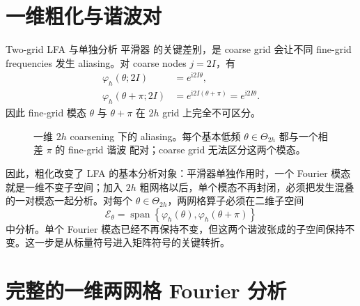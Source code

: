 \section{一维粗化与谐波对}
\label{sec:lfa-1d-aliasing}

Two-grid LFA 与单独分析 平滑器 的关键差别，是 coarse grid 会让不同 fine-grid frequencies 发生 aliasing。对 coarse nodes $j=2I$，有
\begin{align}
\varphi_h(\theta;2I)
&=e^{\mathrm i2I\theta},\\
\varphi_h(\theta+\pi;2I)
&=e^{\mathrm i2I(\theta+\pi)}
=e^{\mathrm i2I\theta}.
\end{align}
因此 fine-grid 模态 $\theta$ 与 $\theta+\pi$ 在 $2h$ grid 上完全不可区分。

\begin{figure}[htbp]
\centering
{}
\caption{一维 $2h$ coarsening 下的 aliasing。每个基本低频 $\theta\in\Theta_{2h}$ 都与一个相差 $\pi$ 的 fine-grid 谐波 配对；coarse grid 无法区分这两个模态。}
\label{fig:lfa-1d-aliasing-pair}
\end{figure}

因此，粗化改变了 LFA 的基本分析对象：平滑器单独作用时，一个 Fourier 模态就是一维不变子空间；加入 $2h$ 粗网格以后，单个模态不再封闭，必须把发生混叠的一对模态一起分析。对每个 $\theta\in\Theta_{2h}$，两网格算子必须在二维子空间
\begin{equation}
\mathcal E_\theta
=\operatorname{span}\left\{
\varphi_h(\theta),
\varphi_h(\theta+\pi)
\right\}
\label{eq:lfa-1d-harmonic-space}
\end{equation}
中分析。单个 Fourier 模态已经不再保持不变，但这两个谐波张成的子空间保持不变。这一步是从标量符号进入矩阵符号的关键转折。

\section{完整的一维两网格 Fourier 分析}
\label{sec:lfa-complete-1d-two-grid}

